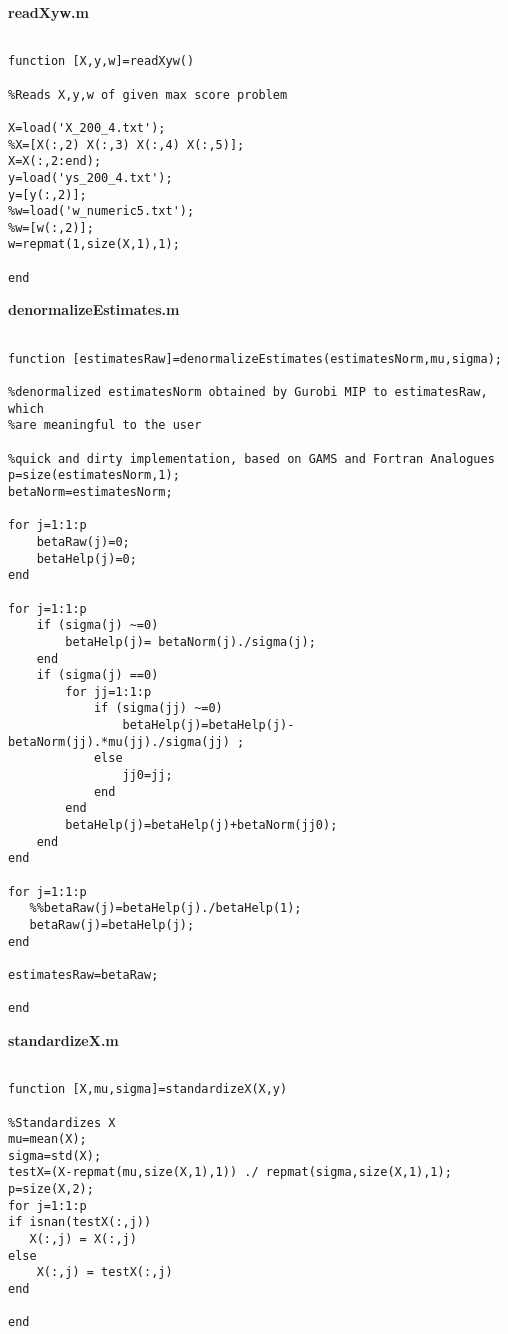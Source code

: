 \documentclass[12pt]{article}
\begin{document}
\textbf{readXyw.m}

\begin{lstlisting}

function [X,y,w]=readXyw()

%Reads X,y,w of given max score problem

X=load('X_200_4.txt');
%X=[X(:,2) X(:,3) X(:,4) X(:,5)];
X=X(:,2:end);
y=load('ys_200_4.txt');
y=[y(:,2)];
%w=load('w_numeric5.txt');
%w=[w(:,2)];
w=repmat(1,size(X,1),1);

end

\end{lstlisting}



\textbf{denormalizeEstimates.m}

\begin{lstlisting}

function [estimatesRaw]=denormalizeEstimates(estimatesNorm,mu,sigma);

%denormalized estimatesNorm obtained by Gurobi MIP to estimatesRaw, which
%are meaningful to the user

%quick and dirty implementation, based on GAMS and Fortran Analogues
p=size(estimatesNorm,1);
betaNorm=estimatesNorm;

for j=1:1:p
    betaRaw(j)=0;
    betaHelp(j)=0;
end

for j=1:1:p
    if (sigma(j) ~=0) 
        betaHelp(j)= betaNorm(j)./sigma(j);
    end
    if (sigma(j) ==0)
        for jj=1:1:p
            if (sigma(jj) ~=0)
                betaHelp(j)=betaHelp(j)-betaNorm(jj).*mu(jj)./sigma(jj) ;
            else
                jj0=jj;
            end
        end
        betaHelp(j)=betaHelp(j)+betaNorm(jj0);
    end
end

for j=1:1:p
   %%betaRaw(j)=betaHelp(j)./betaHelp(1); 
   betaRaw(j)=betaHelp(j); 
end

estimatesRaw=betaRaw;

end

\end{lstlisting}



\textbf{standardizeX.m}

\begin{lstlisting}

function [X,mu,sigma]=standardizeX(X,y)

%Standardizes X
mu=mean(X);
sigma=std(X);
testX=(X-repmat(mu,size(X,1),1)) ./ repmat(sigma,size(X,1),1);
p=size(X,2);
for j=1:1:p
if isnan(testX(:,j))
   X(:,j) = X(:,j)
else
    X(:,j) = testX(:,j)
end

end

\end{lstlisting}
\end{document}
